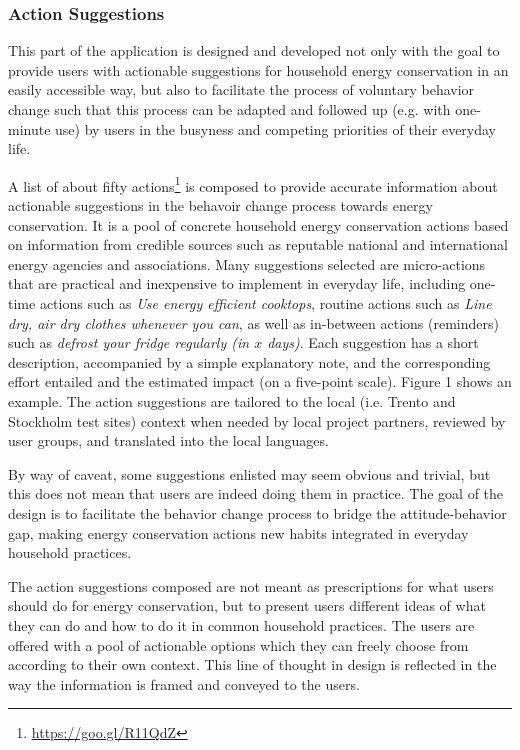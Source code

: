 
\subsubsection{Action Suggestions}

This part of the application is designed and developed not only with the goal to provide users with actionable suggestions for household energy conservation in an easily accessible way, but also to facilitate the process of voluntary behavior change such that this process can be adapted and followed up (e.g. with one-minute use) by users in the busyness and competing priorities of their everyday life. 

A list of about fifty actions\footnote{\url{https://goo.gl/R11QdZ}} is composed to provide accurate information about actionable suggestions in the behavoir change process towards energy conservation. It is a pool of concrete household energy conservation actions based on information from credible sources such as reputable national and international energy agencies and associations. Many suggestions selected are micro-actions that are practical and inexpensive to implement in everyday life, including one-time actions such as \textit{Use energy efficient cooktops}, routine actions such as \textit{Line dry, air dry clothes whenever you can}, as well as in-between actions (reminders) such as \textit{defrost your fridge regularly (in $x$ days)}. Each suggestion has a short description, accompanied by a simple explanatory note, and the corresponding effort entailed and the estimated impact (on a five-point scale). Figure 1 shows an example. The action suggestions are tailored to the local (i.e. Trento and Stockholm test sites) context when needed by local project partners, reviewed by user groups, and translated into the local languages. 

By way of caveat, some suggestions enlisted may seem obvious and trivial, but this does not mean that users are indeed doing them in practice. The goal of the design is to facilitate the behavior change process to bridge the attitude-behavior gap, making energy conservation actions new habits integrated in everyday household practices. 

The action suggestions composed are not meant as prescriptions for what users should do for energy conservation, but to present users different ideas of what they can do and how to do it in common household practices. The users are offered with a pool of actionable options which they can freely choose from according to their own context. This line of thought in design is reflected in the way the information is framed and conveyed to the users. 

